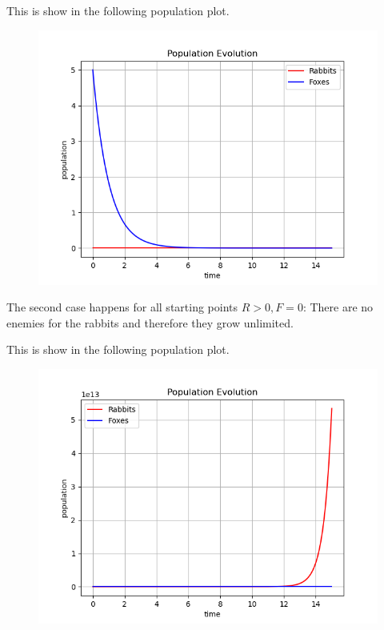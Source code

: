 This is show in the following population plot.

\begin{figure}[H]
    \centering
    \includegraphics[scale=0.75]{images/2024-06-05-pred_prey_01.png}
\end{figure}


The second case happens for all starting points $R>0, F=0$: There are no enemies for the rabbits and therefore they grow unlimited.

This is show in the following population plot.

\begin{figure}[H]
    \centering
    \includegraphics[scale=0.75]{images/2024-06-05-pred_prey_02.png}
\end{figure}


